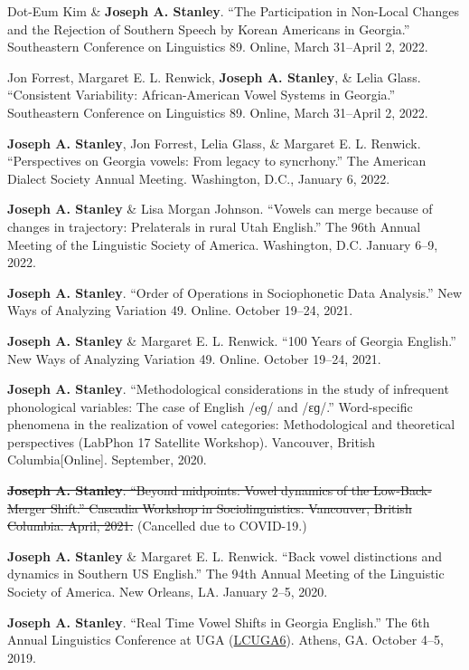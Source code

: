 \documentclass[
]{article}
\begin{document}
Dot-Eum Kim \& \textbf{Joseph A. Stanley}. ``The Participation in
Non-Local Changes and the Rejection of Southern Speech by Korean
Americans in Georgia.'' Southeastern Conference on Linguistics 89.
Online, March 31--April 2, 2022.

Jon Forrest, Margaret E. L. Renwick, \textbf{Joseph A. Stanley}, \&
Lelia Glass. ``Consistent Variability: African-American Vowel Systems in
Georgia.'' Southeastern Conference on Linguistics 89. Online, March
31--April 2, 2022.

\textbf{Joseph A. Stanley}, Jon Forrest, Lelia Glass, \& Margaret E. L.
Renwick. ``Perspectives on Georgia vowels: From legacy to syncrhony.''
The American Dialect Society Annual Meeting. Washington, D.C., January
6, 2022.

\textbf{Joseph A. Stanley} \& Lisa Morgan Johnson. ``Vowels can merge
because of changes in trajectory: Prelaterals in rural Utah English.''
The 96th Annual Meeting of the Linguistic Society of America.
Washington, D.C. January 6--9, 2022.

\textbf{Joseph A. Stanley}. ``Order of Operations in Sociophonetic Data
Analysis.'' New Ways of Analyzing Variation 49. Online. October 19--24,
2021.

\textbf{Joseph A. Stanley} \& Margaret E. L. Renwick. ``100 Years of
Georgia English.'' New Ways of Analyzing Variation 49. Online. October
19--24, 2021.

\textbf{Joseph A. Stanley}. ``Methodological considerations in the study
of infrequent phonological variables: The case of English /eɡ/ and
/ɛɡ/.'' Word-specific phenomena in the realization of vowel categories:
Methodological and theoretical perspectives (LabPhon 17 Satellite
Workshop). Vancouver, British Columbia{[}Online{]}. September, 2020.

\st{\textbf{Joseph A. Stanley}. ``Beyond midpoints: Vowel dynamics of
the Low-Back-Merger Shift.'' Cascadia Workshop in Sociolinguistics.
Vancouver, British Columbia. April, 2021.} (Cancelled due to COVID-19.)

\textbf{Joseph A. Stanley} \& Margaret E. L. Renwick. ``Back vowel
distinctions and dynamics in Southern US English.'' The 94th Annual
Meeting of the Linguistic Society of America. New Orleans, LA. January
2--5, 2020.

\textbf{Joseph A. Stanley}. ``Real Time Vowel Shifts in Georgia
English.'' The 6th Annual Linguistics Conference at UGA
(\href{http://linguistics.uga.edu/lcuga-6}{LCUGA6}). Athens, GA. October
4--5, 2019.
\end{document}
